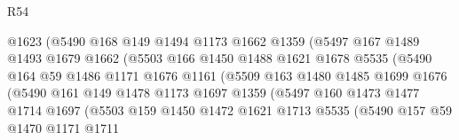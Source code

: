 \begin{lexlean}{R54}
\begin{coremodule}
                            @1623
                            (@5490
                              @168
                              @149
                              @1494
                              @1173
                              @1662
                              @1359
                              (@5497
                                @167
                                @1489
                                @1493
                                @1679
                                @1662
                                (@5503
                                  @166
                                  @1450
                                  @1488
                                  @1621
                                  @1678
                                  @5535
                                  (@5490
                                    @164
                                    @59
                                    @1486
                                    @1171
                                    @1676
                                    @1161
                                    (@5509
                                      @163
                                      @1480
                                      @1485
                                      @1699
                                      @1676
                                      (@5490
                                        @161
                                        @149
                                        @1478
                                        @1173
                                        @1697
                                        @1359
                                        (@5497
                                          @160
                                          @1473
                                          @1477
                                          @1714
                                          @1697
                                          (@5503
                                            @159
                                            @1450
                                            @1472
                                            @1621
                                            @1713
                                            @5535
                                            (@5490
                                              @157
                                              @59
                                              @1470
                                              @1171
                                              @1711

\end{coremodule}
\end{lexlean}

